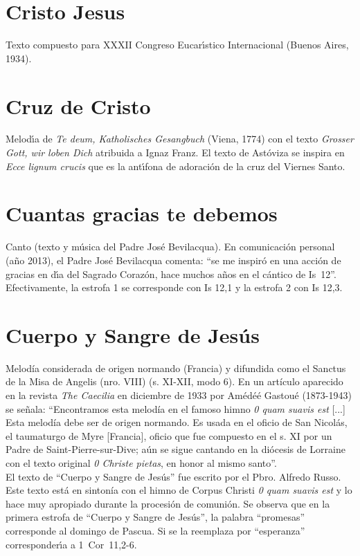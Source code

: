 \documentclass[landscape,12pt]{report}
\begin{document}
\section*{\small Cristo Jesus} Texto compuesto para XXXII Congreso Eucar\'\i stico Internacional (Buenos Aires, 1934).
\section*{\small Cruz de Cristo} \noindent\footnotesize Melod\'\i a de \textit{Te deum, Katholisches Gesangbuch} (Viena, 1774) con el texto \textit{Grosser Gott, wir loben Dich} atribuida a Ignaz Franz. El texto de Ast\'oviza se inspira en \textit{Ecce lignum crucis} que es la ant\'\i fona de adoraci\'on de la cruz del Viernes Santo.
\section*{\small Cuantas gracias te debemos} \noindent\footnotesize Canto (texto y m\'usica del Padre Jos\'e Bevilacqua). En comunicaci\'on personal (a\~no 2013), el Padre Jos\'e Bevilacqua comenta: ``se me inspir\'o en una acci\'on de gracias en d\'\i a del Sagrado Coraz\'on, hace muchos a\~nos en el c\'antico de \mbox{Is 12}''. Efectivamente, la estrofa 1 se corresponde con Is 12,1 y la estrofa 2 con Is 12,3.
\section*{\small Cuerpo y Sangre de Jes\'us} \noindent\footnotesize Melodía 
considerada de origen normando (Francia) y difundida como el Sanctus de la 
Misa de Angelis (nro. VIII) (s. XI-XII, modo 6). En un artículo aparecido 
en la revista \emph{The Caecilia} en diciembre de 1933 por Amédéé Gastoué 
(1873-1943) se señala: ``Encontramos esta melodía en el famoso himno \emph{0 
quam suavis est} [...] Esta melodía debe ser de origen normando. Es usada en el 
oficio de San Nicolás, el taumaturgo de Myre [Francia], oficio que fue 
compuesto en el s. XI por un Padre de Saint-Pierre-sur-Dive; aún se sigue 
cantando en la diócesis de Lorraine con el texto original \emph{0 Christe 
pietas}, en honor al mismo santo''.  \\

\noindent El texto de ``Cuerpo y Sangre de Jesús'' fue escrito por el Pbro. 
Alfredo Russo. Este texto está en sintonía con el himno de Corpus Christi 
\emph{0 quam suavis est} y lo hace muy apropiado durante la procesión de 
comunión. Se observa que en la primera estrofa de ``Cuerpo y Sangre de Jesús'', 
la palabra ``promesas'' corresponde al domingo de Pascua. Si se la reemplaza por 
``esperanza'' corresponder\'\i a a \mbox{1 Cor 11,2-6}.
\end{document}
